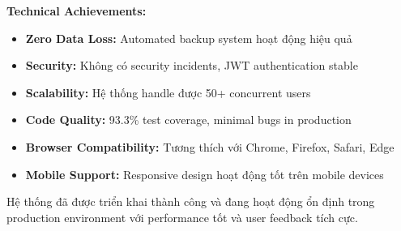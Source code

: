 \documentclass[../DoAn.tex]{subfiles}
\begin{document}
\textbf{Technical Achievements:}
\begin{itemize}
    \item \textbf{Zero Data Loss:} Automated backup system hoạt động hiệu quả
    \item \textbf{Security:} Không có security incidents, JWT authentication stable
    \item \textbf{Scalability:} Hệ thống handle được 50+ concurrent users
    \item \textbf{Code Quality:} 93.3\% test coverage, minimal bugs in production
    \item \textbf{Browser Compatibility:} Tương thích với Chrome, Firefox, Safari, Edge
    \item \textbf{Mobile Support:} Responsive design hoạt động tốt trên mobile devices
\end{itemize}

Hệ thống đã được triển khai thành công và đang hoạt động ổn định trong production environment với performance tốt và user feedback tích cực.
\end{document}
